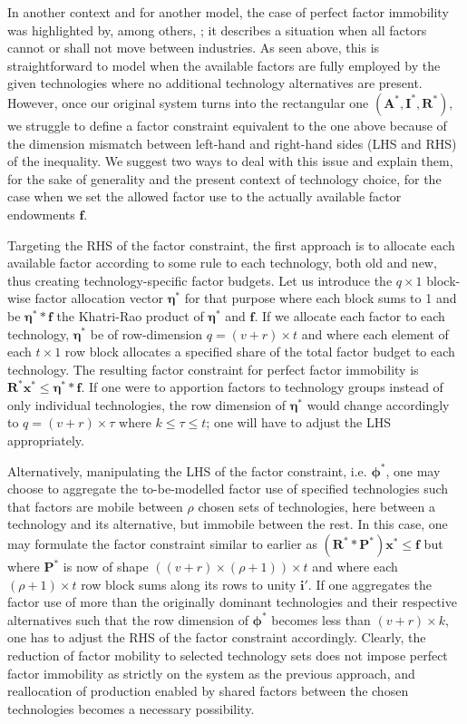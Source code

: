 In another context and for another model, the case of perfect factor immobility was highlighted by, among others, \textcite{tenRaa_1994,shestalova_2019}; it describes a situation when all factors cannot or shall not move between industries. As seen above, this is straightforward to model when the available factors are fully employed by the given technologies where no additional technology alternatives are present. However, once our original system turns into the rectangular one $(\bm{A}^{*}, \bm{I}^{*}, \bm{R}^{*})$, we struggle to define a factor constraint equivalent to the one above because of the dimension mismatch between left-hand and right-hand sides (LHS and RHS) of the inequality. We suggest two ways to deal with this issue and explain them, for the sake of generality and the present context of technology choice, for the case when we set the allowed factor use to the actually available factor endowments $\bm{f}$.


Targeting the RHS of the factor constraint, the first approach is to allocate each available factor according to some rule to each technology, both old and new, thus creating technology-specific factor budgets. Let us introduce the $q \times 1$ block-wise factor allocation vector $\bm{\eta}^{*}$ for that purpose where each block sums to 1 and be $\bm{\eta}^{*} \ast \bm{f}$ the Khatri-Rao product of $\bm{\eta}^{*}$ and $\bm{f}$. If we allocate each factor to each technology, $\bm{\eta}^{*}$ be of row-dimension $q = (v + r) \times t$ and where each element of each $t \times 1$ row block allocates a specified share of the total factor budget to each technology. The resulting factor constraint for perfect factor immobility is $\bm{R}^{*} \bm{x}^{*} \le \bm{\eta}^{*} \ast \bm{f}$. If one were to apportion factors to technology groups instead of only individual technologies, the row dimension of $\bm{\eta}^{*}$ would change accordingly to $q = (v + r) \times \tau$ where $k \le \tau \le t$; one will have to adjust the LHS appropriately.

Alternatively, manipulating the LHS of the factor constraint, i.e. $\bm{\phi}^{*}$, one may choose to aggregate the to-be-modelled factor use of specified technologies such that factors are mobile between $\rho$ chosen sets of technologies, here between a technology and its alternative, but immobile between the rest. In this case, one may formulate the factor constraint similar to earlier as $(\bm{R}^{*} \ast \bm{P}^{*}) \bm{x}^{*} \le \bm{f}$ but where $\bm{P}^{*}$ is now of shape $((v + r) \times (\rho + 1)) \times t$ and where each $(\rho + 1) \times t$ row block sums along its rows to unity $\bm{i}'$. If one aggregates the factor use of more than the originally dominant technologies and their respective alternatives such that the row dimension of $\bm{\phi}^{*}$ becomes less than $(v + r) \times k$, one has to adjust the RHS of the factor constraint accordingly. Clearly, the reduction of factor mobility to selected technology sets does not impose perfect factor immobility as strictly on the system as the previous approach, and reallocation of production enabled by shared factors between the chosen technologies becomes a necessary possibility.

